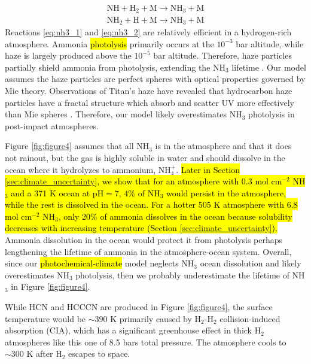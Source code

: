 \begin{gather} 
  \mathrm{NH} + \mathrm{H_2} + \mathrm{M} \rightarrow \mathrm{NH_3} + \mathrm{M} \label{eq:nh3_1} 
  \\
  \mathrm{NH_2} + \mathrm{H} + \mathrm{M} \rightarrow \mathrm{NH_3} + \mathrm{M} \label{eq:nh3_2}
\end{gather}
Reactions \ref{eq:nh3_1} and \ref{eq:nh3_2} are relatively efficient in a hydrogen-rich atmosphere. Ammonia \hl{photolysis} primarily occurs at the $10^{-3}$ bar altitude, while haze is largely produced above the $10^{-5}$ bar altitude. Therefore, haze particles partially shield ammonia from photolysis, extending the NH$_3$ lifetime \citep{Sagan_1997}. Our model assumes the haze particles are perfect spheres with optical properties governed by Mie theory. Observations of Titan's haze have revealed that hydrocarbon haze particles have a fractal structure which absorb and scatter UV more effectively than Mie spheres \citep{Wolf_2010}. Therefore, our model likely overestimates NH$_3$ photolysis in post-impact atmospheres. 

Figure \ref{fig:figure4} assumes that all NH$_3$ is in the atmosphere and that it does not rainout, but the gas is highly soluble in water and should dissolve in the ocean where it hydrolyzes to ammonium, NH$_4^+$. \hl{Later in Section \mbox{\ref{sec:climate_uncertainty}}, we show that for an atmosphere with 0.3 mol cm$^{-2}$ NH$_3$ and a 371 K ocean at $\text{pH} = 7$, $4\%$ of NH$_3$ would persist in the atmosphere, while the rest is dissolved in the ocean. For a hotter 505 K atmosphere with 6.8 mol cm$^{-2}$ NH$_3$, only 20\% of ammonia dissolves in the ocean because solubility decreases with increasing temperature (Section \mbox{\ref{sec:climate_uncertainty}}).} Ammonia dissolution in the ocean would protect it from photolysis perhaps lengthening the lifetime of ammonia in the atmosphere-ocean system. Overall, since our \hl{photochemical-climate} model neglects NH$_3$ ocean dissolution and likely overestimates NH$_3$ photolysis, then we probably underestimate the lifetime of NH$_3$ in Figure \ref{fig:figure4}.

While HCN and HCCCN are produced in Figure \ref{fig:figure4}, the surface temperature would be $\sim 390$ K primarily caused by H$_2$-H$_2$ collision-induced absorption (CIA), which has a significant greenhouse effect in thick H$_2$ atmospheres like this one of 8.5 bars total pressure. The atmosphere cools to $\sim 300$ K after H$_2$ escapes to space.

